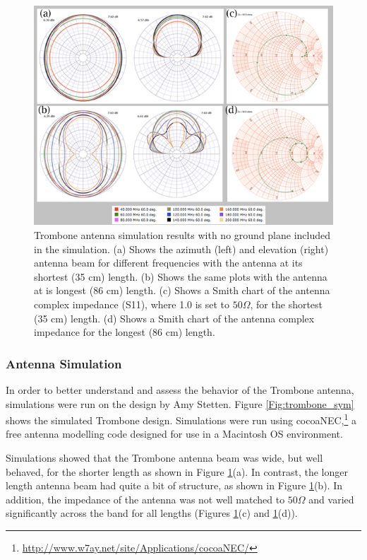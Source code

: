 \begin{figure}[htb]
\begin{center}
\includegraphics[width=0.95\linewidth]{SCIHI_system/figures/trombone_no_gp.jpg}
\caption{Trombone antenna simulation results with no ground plane included in the simulation. (a) Shows the azimuth (left) and elevation (right) antenna beam for different frequencies with the antenna at its shortest (35 cm) length. (b) Shows the same plots with the antenna at is longest (86 cm) length. (c) Shows a Smith chart of the antenna complex impedance (S11), where 1.0 is set to $50 \Omega$, for the shortest (35 cm) length. (d) Shows a Smith chart of the antenna complex impedance for the longest (86 cm) length. }
\label{Fig:trsym_nogp}
\end{center}
\end{figure}

\subsubsection{Antenna Simulation}
In order to better understand and assess the behavior of the Trombone antenna, simulations were run on the design by Amy Stetten. Figure \ref{Fig:trombone_sym} shows the simulated Trombone design. Simulations were run using cocoaNEC,\footnote{\url{http://www.w7ay.net/site/Applications/cocoaNEC/}} a free antenna modelling code designed for use in a Macintosh OS environment. 

Simulations showed that the Trombone antenna beam was wide, but well behaved, for the shorter length as shown in Figure \ref{Fig:trsym_nogp}(a). In contrast, the longer length antenna beam had quite a bit of structure, as shown in Figure \ref{Fig:trsym_nogp}(b). In addition, the impedance of the antenna was not well matched to $50 \Omega$ and varied significantly across the band for all lengths (Figures \ref{Fig:trsym_nogp}(c) and \ref{Fig:trsym_nogp}(d)). 

